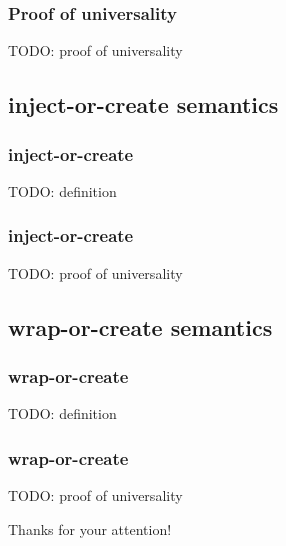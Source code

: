     \begin{frame}[t]\frametitle{Proof of universality}
      TODO: proof of universality
    \end{frame}
    \note{}
  

  \subsection{inject-or-create semantics} %
  \label{sub:inject_or_create_semantics}

    \begin{frame}[t]\frametitle{inject-or-create}
      TODO: definition      
    \end{frame}
    \note{}

    \begin{frame}[t]\frametitle{inject-or-create}
      TODO: proof of universality
    \end{frame}
    \note{}


  \subsection{wrap-or-create semantics} %
  \label{sub:wrap_or_create_semantics}
  
    \begin{frame}[t]\frametitle{wrap-or-create}
      TODO: definition
    \end{frame}
    \note{}

    \begin{frame}[t]\frametitle{wrap-or-create}
      TODO: proof of universality
    \end{frame}
    \note{}



\begin{frame}[plain]
  
\end{frame}

\begin{frame}[plain]
  \begin{center}
    Thanks for your attention!
  \end{center}
\end{frame}


